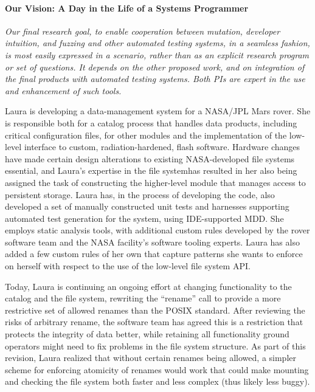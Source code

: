 \paragraph{Our Vision: A Day in the Life of a Systems Programmer}

\begin{framed} \emph{Our final research goal, to enable cooperation between mutation, developer intuition, and fuzzing and other automated testing systems, in a seamless fashion, is most easily expressed in a scenario, rather than as an explicit research program or set of questions.  It depends on the other proposed work, and on integration of the final products with automated testing systems.  Both PIs are expert in the use and enhancement of such tools.}
  \end{framed}

Laura is developing a data-management system for a NASA/JPL Mars rover.  She is responsible both for a catalog process that handles data products, including critical configuration files, for other modules and the implementation of the low-level interface to custom, radiation-hardened, flash software.  Hardware changes have made certain design alterations to existing NASA-developed file systems essential, and Laura's expertise in the file systemhas resulted in her also being assigned the task of constructing the higher-level module that manages access to persistent storage.
Laura has, in the process of developing the code, also developed a set of manually constructed unit tests and harnesses supporting automated test generation for the system, using IDE-supported MDD.  She employs static analysis tools, with additional custom rules developed by the rover software team and the NASA facility's software tooling experts.  Laura has also added a few custom rules of her own that capture patterns she wants to enforce on herself with respect to the use of the low-level file system API.

Today, Laura is continuing an ongoing effort at changing functionality to the catalog and the file system, rewriting the ``rename'' call to provide a more restrictive set of allowed renames than the POSIX standard.  After reviewing the risks of arbitrary rename, the software team has agreed this is a restriction that protects the integrity of data better, while retaining all functionality ground operators might need to fix problems in the file system structure.  As part of this revision, Laura realized that without certain renames being allowed, a simpler scheme for enforcing atomicity of renames would work that could make mounting and checking the file system both faster and less complex (thus likely less buggy).

